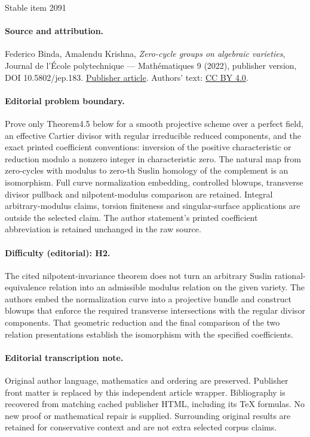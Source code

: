 \documentclass[11pt]{article}
\numberwithin{equation}{section}
\theoremstyle{definition}
\begin{document}
\begin{center}{\Large Stable item 2091}\end{center}
\paragraph{Source and attribution.}
Federico Binda, Amalendu Krishna, \emph{Zero-cycle groups on algebraic varieties}, Journal de l’École polytechnique — Mathématiques 9 (2022), publisher version, DOI 10.5802/jep.183. \href{https://jep.centre-mersenne.org/articles/10.5802/jep.183/}{Publisher article}. Authors' text: \href{https://creativecommons.org/licenses/by/4.0/}{CC BY 4.0}.
\paragraph{Editorial problem boundary.}
Prove only Theorem4.5 below for a smooth projective scheme over a perfect field, an effective Cartier divisor with regular irreducible reduced components, and the exact printed coefficient conventions: inversion of the positive characteristic or reduction modulo a nonzero integer in characteristic zero. The natural map from zero-cycles with modulus to zero-th Suslin homology of the complement is an isomorphism. Full curve normalization embedding, controlled blowups, transverse divisor pullback and nilpotent-modulus comparison are retained. Integral arbitrary-modulus claims, torsion finiteness and singular-surface applications are outside the selected claim. The author statement's printed coefficient abbreviation is retained unchanged in the raw source.
\paragraph{Difficulty (editorial): H2.}
The cited nilpotent-invariance theorem does not turn an arbitrary Suslin rational-equivalence relation into an admissible modulus relation on the given variety. The authors embed the normalization curve into a projective bundle and construct blowups that enforce the required transverse intersections with the regular divisor components. That geometric reduction and the final comparison of the two relation presentations establish the isomorphism with the specified coefficients.
\paragraph{Editorial transcription note.}
Original author language, mathematics and ordering are preserved. Publisher front matter is replaced by this independent article wrapper. Bibliography is recovered from matching cached publisher HTML, including its TeX formulas. No new proof or mathematical repair is supplied. Surrounding original results are retained for conservative context and are not extra selected corpus claims.
\clearpage
\end{document}
